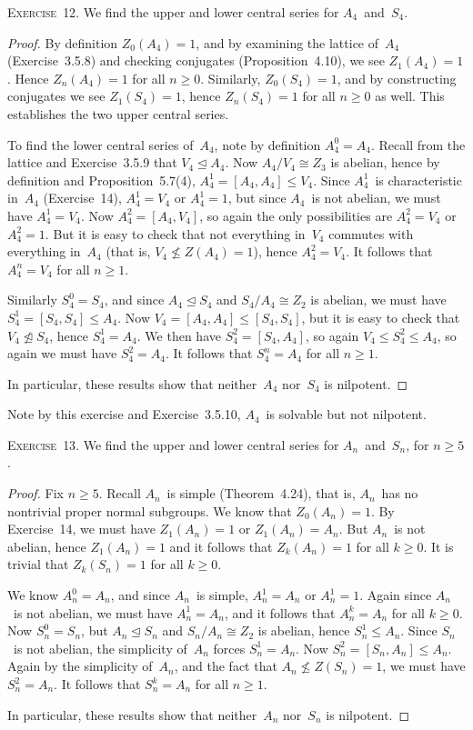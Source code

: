 \documentclass[letterpaper]{article}
\newcommand{\exercise}[1]{\goodbreak\noindent\textsc{Exercise~{#1}.}}
\newcommand{\iso}{\cong}
\newcommand{\subgroup}{\le}
\newcommand{\normal}{\trianglelefteq}
\begin{document}
\exercise{12}
We find the upper and lower central series for $A_4$~and~$S_4$.
\begin{proof}
By definition $Z_0(A_4)=1$, and by examining the lattice of~$A_4$ (Exercise~3.5.8) and checking conjugates (Proposition~4.10), we see $Z_1(A_4)=1$. Hence $Z_n(A_4)=1$ for all $n\ge0$. Similarly, $Z_0(S_4)=1$, and by constructing conjugates we see $Z_1(S_4)=1$, hence $Z_n(S_4)=1$ for all $n\ge0$ as well. This establishes the two upper central series.

To find the lower central series of~$A_4$, note by definition $A_4^0=A_4$. Recall from the lattice and Exercise~3.5.9 that $V_4\normal A_4$. Now $A_4/V_4\iso Z_3$ is abelian, hence by definition and Proposition~5.7(4), $A_4^1=[A_4,A_4]\subgroup V_4$. Since $A_4^1$~is characteristic in~$A_4$ (Exercise~14), $A_4^1=V_4$ or $A_4^1=1$, but since $A_4$~is not abelian, we must have $A_4^1=V_4$. Now $A_4^2=[A_4,V_4]$, so again the only possibilities are $A_4^2=V_4$ or $A_4^2=1$. But it is easy to check that not everything in~$V_4$ commutes with everything in~$A_4$ (that is, $V_4\not\subgroup Z(A_4)=1$), hence $A_4^2=V_4$. It follows that $A_4^n=V_4$ for all $n\ge1$.

Similarly $S_4^0=S_4$, and since $A_4\normal S_4$ and $S_4/A_4\iso Z_2$ is abelian, we must have $S_4^1=[S_4,S_4]\subgroup A_4$. Now $V_4=[A_4,A_4]\subgroup[S_4,S_4]$, but it is easy to check that $V_4\not\normal S_4$, hence $S_4^1=A_4$. We then have $S_4^2=[S_4,A_4]$, so again $V_4\subgroup S_4^2\subgroup A_4$, so again we must have $S_4^2=A_4$. It follows that $S_4^n=A_4$ for all $n\ge1$.

In particular, these results show that neither~$A_4$ nor~$S_4$ is nilpotent.
\end{proof}
\noindent Note by this exercise and Exercise~3.5.10, $A_4$~is solvable but not nilpotent.

\bigskip
\exercise{13}
We find the upper and lower central series for $A_n$~and~$S_n$, for $n\ge5$.
\begin{proof}
Fix $n\ge5$. Recall $A_n$~is simple (Theorem~4.24), that is, $A_n$~has no nontrivial proper normal subgroups. We know that $Z_0(A_n)=1$. By Exercise~14, we must have $Z_1(A_n)=1$ or $Z_1(A_n)=A_n$. But $A_n$~is not abelian, hence $Z_1(A_n)=1$ and it follows that $Z_k(A_n)=1$ for all $k\ge0$. It is trivial that $Z_k(S_n)=1$ for all $k\ge0$.

We know $A_n^0=A_n$, and since $A_n$~is simple, $A_n^1=A_n$ or $A_n^1=1$. Again since $A_n$~is not abelian, we must have $A_n^1=A_n$, and it follows that $A_n^k=A_n$ for all $k\ge0$. Now $S_n^0=S_n$, but $A_n\normal S_n$ and $S_n/A_n\iso Z_2$ is abelian, hence $S_n^1\subgroup A_n$. Since $S_n$~is not abelian, the simplicity of~$A_n$ forces $S_n^1=A_n$. Now $S_n^2=[S_n,A_n]\subgroup A_n$. Again by the simplicity of~$A_n$, and the fact that $A_n\not\subgroup Z(S_n)=1$, we must have $S_n^2=A_n$. It follows that $S_n^k=A_n$ for all $n\ge1$.

In particular, these results show that neither~$A_n$ nor~$S_n$ is nilpotent.
\end{proof}
\end{document}
